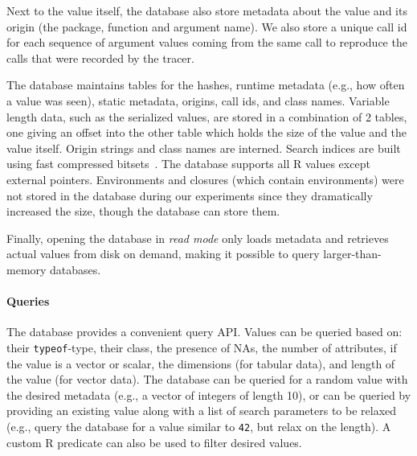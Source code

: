 \documentclass[sigplan,anonymous,review]{acmart}
\begin{document}
Next to the value itself, the database also store metadata about the value and its origin (the package, function and argument name).
We also store a unique call id for each sequence of argument values coming from the same call to reproduce the calls that were recorded by the tracer.

The database maintains tables for the hashes, runtime metadata (e.g., how often a value was seen), static metadata, origins, call ids, and class names. 
Variable length data, such as the serialized values, are stored in a combination of 2 tables, one giving an offset into the other table which holds the size of the value and the value itself. 
 Origin strings and class names are interned. 
Search indices are built using fast compressed bitsets~\cite{chambi2016better}.
The database supports all R values except external pointers.
Environments and closures (which contain environments) were not stored in the database during our experiments since they dramatically increased the size, though the database can store them.

Finally, opening the database in \textit{read mode} only loads metadata and retrieves actual values from disk on demand, making it possible to query larger-than-memory databases.

\paragraph{Queries}

The database provides a convenient query API.
Values can be queried based on: their {\tt typeof}-type, their class, the presence of NAs, the number of attributes, if the value is a vector or scalar, the dimensions (for tabular data), and length of the value (for vector data).
The database can be queried for a random value with the desired metadata (e.g., a vector of integers of length 10), or can be queried by providing an existing value along with a list of search parameters to be relaxed (e.g., query the database for a value similar to {\tt 42}, but relax on the length). 
A custom R predicate can also be used to filter desired values.
\end{document}

